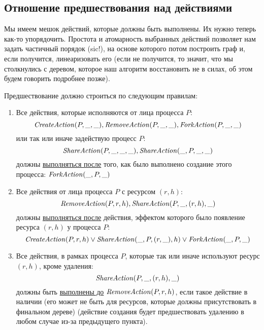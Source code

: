 \subsection{Отношение предшествования над действиями}

Мы имеем мешок действий, которые должны быть выполнены. Их нужно теперь как-то упорядочить. Простота и атомарность выбранных действий позволяет нам задать частичный порядок (sic!), на основе которого потом построить граф и, если получится, линеаризовать его (если не получится, то значит, что мы столкнулись с деревом, которое наш алгоритм восстановить не в силах, об этом будем говорить подробнее позже).

Предшествование должно строиться по следующим правилам:

\begin{enumerate}[label=(\arabic*)]
	\item \label{precrule:afterfork} Все действия, которые исполняются от лица процесса $P$:
	\begin{equation*}
	    \text{\textit{CreateAction}}(P, \_, \_), \text{\textit{RemoveAction}}(P, \_, \_), \text{\textit{ForkAction}}(P, \_, \_)
	\end{equation*}
	или так или иначе задействую процесс $P$: 
	\begin{equation*}
	    \text{\textit{ShareAction}}(P, \_, \_, \_), \text{\textit{ShareAction}}(\_, P, \_, \_)
	\end{equation*} 
	должны \underline{выполняться после} того, как было выполнено создание этого процесса: $\text{\textit{ForkAction}}(\_, P, \_)$

	\item \label{precrule:actswithres} Все действия от лица процесса $P$ с ресурсом $(r, h)$: 
	\begin{equation*}
	    \text{\textit{RemoveAction}}(P, r, h), \text{\textit{ShareAction}}(P, \_, (r, h), \_)
	\end{equation*}
	должны \underline{выполняться после} действия, эффектом которого было появление ресурса $(r, h)$ у процесса $P$:
	\begin{equation*}
	    \text{\textit{CreateAction}}(P, r, h) \lor \text{\textit{ShareAction}}(\_, P, (r, \_), h) \lor \text{\textit{ForkAction}}(\_, P, \_)
	\end{equation*}
	
	\item \label{precrule:beforeremove} Все действия, в рамках процесса $P$, которые так или иначе используют ресурс $(r, h)$, кроме удаления:
	\begin{equation*}
		\text{\textit{ShareAction}}(P, \_, (r, h), \_)
	\end{equation*} 
	должны быть \underline{выполнены до} $\text{\textit{RemoveAction}}(P, r, h)$, если такое действие в наличии (его может не быть для ресурсов, которые должны присутствовать в финальном дереве) (действие создания будет предшествовать удалению в любом случае из-за предыдущего пункта).


\end{enumerate}
